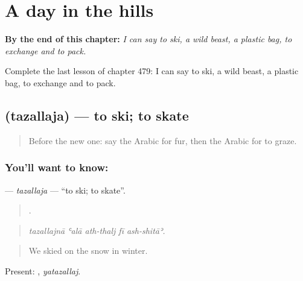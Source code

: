 
\chapter{A day in the hills}
\label{ch:ar-a-day-in-the-hills}

\begin{chapteropening}
\textbf{By the end of this chapter:} \emph{I can say to ski, a wild beast, a plastic bag, to exchange and to pack.}

Complete the last lesson of chapter 479: I can say to ski, a wild beast, a plastic bag, to exchange and to pack.
\end{chapteropening}

\section[\texorpdfstring{\ar{تزلج} (tazallaja)}{تزلج (tazallaja)}]{ (tazallaja) — to ski; to skate}

\label{lesson:AR-C479-tazallaja}



\begin{quote}
Before the new one: say the Arabic for fur, then the Arabic for to graze.
\end{quote}

\subsection*{You'll want to know: }
\textbf{} — \emph{tazallaja} — \textquotedblleft{}to ski; to skate\textquotedblright{}.

\begin{quote}
    .
\end{quote}

\begin{quote}
\emph{tazallajnā ʿalā ath-thalj fī ash-shitāʾ.}
\end{quote}

\begin{quote}
We skied on the snow in winter.
\end{quote}

Present: , \emph{yatazallaj}.


